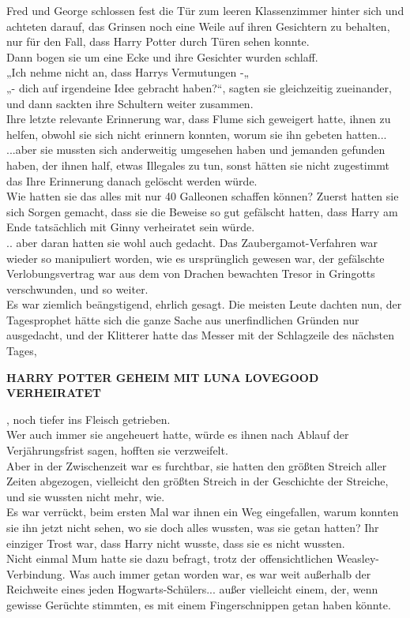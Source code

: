 {Fred und George schlossen fest die Tür zum leeren Klassenzimmer hinter sich und achteten darauf, das Grinsen noch eine Weile auf ihren Gesichtern zu behalten, nur für den Fall, dass Harry Potter durch Türen sehen konnte.\\ Dann bogen sie um eine Ecke und ihre Gesichter wurden schlaff.\\ „Ich nehme nicht an, dass Harrys Vermutungen -„\\ „- dich auf irgendeine Idee gebracht haben?“, sagten sie gleichzeitig zueinander, und dann sackten ihre Schultern weiter zusammen.\\ Ihre letzte relevante Erinnerung war, dass Flume sich geweigert hatte, ihnen zu helfen, obwohl sie sich nicht erinnern konnten, worum sie ihn gebeten hatten...\\ ...aber sie mussten sich anderweitig umgesehen haben und jemanden gefunden haben, der ihnen half, etwas Illegales zu tun, sonst hätten sie nicht zugestimmt das Ihre Erinnerung danach gelöscht werden würde.\\ Wie hatten sie das alles mit nur 40 Galleonen schaffen können? Zuerst hatten sie sich Sorgen gemacht, dass sie die Beweise so gut gefälscht hatten, dass Harry am Ende tatsächlich mit Ginny verheiratet sein würde.\\ .. aber daran hatten sie wohl auch gedacht. Das Zaubergamot-Verfahren war wieder so manipuliert worden, wie es ursprünglich gewesen war, der gefälschte Verlobungsvertrag war aus dem von Drachen bewachten Tresor in Gringotts verschwunden, und so weiter.\\ Es war ziemlich beängstigend, ehrlich gesagt. Die meisten Leute dachten nun, der Tagesprophet hätte sich die ganze Sache aus unerfindlichen Gründen nur ausgedacht, und der Klitterer hatte das Messer mit der Schlagzeile des nächsten Tages,

\textbf{HARRY POTTER GEHEIM MIT LUNA LOVEGOOD VERHEIRATET}

, noch tiefer ins Fleisch getrieben.\\ Wer auch immer sie angeheuert hatte, würde es ihnen nach Ablauf der Verjährungsfrist sagen, hofften sie verzweifelt.\\ Aber in der Zwischenzeit war es furchtbar, sie hatten den größten Streich aller Zeiten abgezogen, vielleicht den größten Streich in der Geschichte der Streiche, und sie wussten nicht mehr, wie.\\ Es war verrückt, beim ersten Mal war ihnen ein Weg eingefallen, warum konnten sie ihn jetzt nicht sehen, wo sie doch alles wussten, was sie getan hatten? Ihr einziger Trost war, dass Harry nicht wusste, dass sie es nicht wussten.\\ Nicht einmal Mum hatte sie dazu befragt, trotz der offensichtlichen Weasley-Verbindung. Was auch immer getan worden war, es war weit außerhalb der Reichweite eines jeden Hogwarts-Schülers... außer vielleicht einem, der, wenn gewisse Gerüchte stimmten, es mit einem Fingerschnippen getan haben könnte.

}

